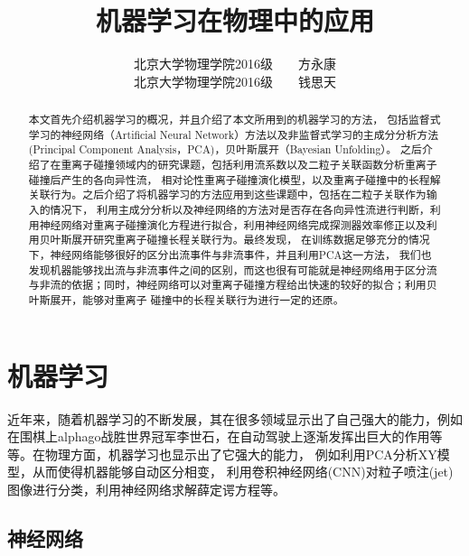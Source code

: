 \documentclass[aps,pre,12pt,preprint,onecolumn,showpacs,showkeys]{revtex4-1}
\begin{document}
\title{\songti{}\bf{机器学习在物理中的应用}\vspace{15mm}}
\author{\songti{}北京大学物理学院2016级~~~~方永康\vspace{2mm}\\
\songti{}北京大学物理学院2016级~~~~钱思天\vspace{2mm}}

\begin{abstract}
\vspace{10mm}
\begin{spacing}{1.5}
\songti{}
本文首先介绍机器学习的概况，并且介绍了本文所用到的机器学习的方法，
包括监督式学习的神经网络（Artificial Neural Network）方法以及非监督式学习的主成分分析方法(Principal Component Analysis，PCA)，贝叶斯展开（Bayesian Unfolding）。
之后介绍了在重离子碰撞领域内的研究课题，包括利用流系数以及二粒子关联函数分析重离子碰撞后产生的各向异性流，
相对论性重离子碰撞演化模型，以及重离子碰撞中的长程解关联行为。之后介绍了将机器学习的方法应用到这些课题中，包括在二粒子关联作为输入的情况下，
利用主成分分析以及神经网络的方法对是否存在各向异性流进行判断，利用神经网络对重离子碰撞演化方程进行拟合，利用神经网络完成探测器效率修正以及利用贝叶斯展开研究重离子碰撞长程关联行为。最终发现，
在训练数据足够充分的情况下，神经网络能够很好的区分出流事件与非流事件，并且利用PCA这一方法，
我们也发现机器能够找出流与非流事件之间的区别，而这也很有可能就是神经网络用于区分流与非流的依据；同时，神经网络可以对重离子碰撞方程给出快速的较好的拟合；利用贝叶斯展开，能够对重离子
碰撞中的长程关联行为进行一定的还原。
\end{spacing}
\end{abstract}
\maketitle


\section{机器学习}
近年来，随着机器学习的不断发展，其在很多领域显示出了自己强大的能力，例如在围棋上alphago战胜世界冠军李世石，在自动驾驶上逐渐发挥出巨大的作用等等。在物理方面，机器学习也显示出了它强大的能力，
例如利用PCA分析XY模型，从而使得机器能够自动区分相变\cite{PhysRevB.96.144432}，
利用卷积神经网络(CNN)对粒子喷注(jet)图像进行分类\cite{PhysRevD.94.112002}，利用神经网络求解薛定谔方程\cite{PhysRevA.96.042113}等。
\subsection{神经网络}
\end{document}
